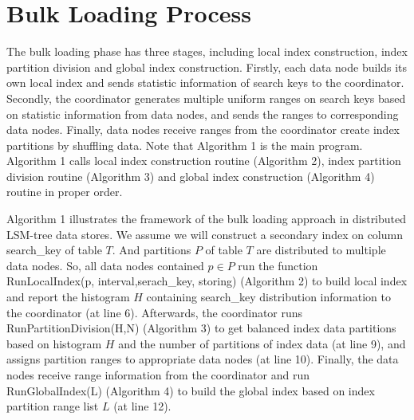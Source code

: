 \section{Bulk Loading Process}
\vspace{-0.2cm}
The bulk loading phase has three stages, including local index construction, index partition division and global index construction. Firstly, each data node builds its own local index and sends statistic information of search keys to the coordinator. Secondly, the coordinator generates multiple uniform ranges on search keys based on statistic information from data nodes, and sends the ranges to corresponding data nodes. Finally, data nodes receive ranges from the coordinator create index partitions by shuffling data. Note that Algorithm 1 is the main program. Algorithm 1 calls local index construction routine (Algorithm 2), index partition division routine (Algorithm 3) and global index construction (Algorithm 4) routine in proper order.

Algorithm 1 illustrates the framework of the bulk loading approach in distributed LSM-tree data stores. We assume we will construct a secondary index on column search\_key of table $T$. And partitions $P$ of table $T$ are distributed to multiple data nodes. So, all data nodes contained $p\in P$  run the function RunLocalIndex(p, interval,serach\_key, storing) (Algorithm 2) to build local index and report the histogram $H$ containing search\_key distribution information to the coordinator (at line 6). Afterwards, the coordinator runs RunPartitionDivision(H,N) (Algorithm 3) to get balanced index data partitions based on histogram $H$ and the number of partitions of index data (at line 9), and assigns partition ranges to appropriate data nodes (at line 10). Finally, the data nodes receive range information from the coordinator and run RunGlobalIndex(L) (Algorithm 4) to build the global index based on index partition range list $L$ (at line 12).


